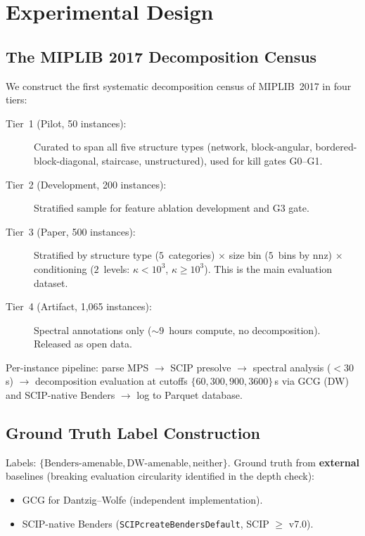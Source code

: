 \documentclass[12pt]{article}
\begin{document}
\section{Experimental Design}
\label{sec:experiments}

\subsection{The MIPLIB 2017 Decomposition Census}
\label{sec:census}

We construct the first systematic decomposition census of MIPLIB~2017
\citep{gleixner2021miplib} in four tiers:

\begin{description}
\item[Tier~1 (Pilot, 50 instances):] Curated to span all five structure
  types (network, block-angular, bordered-block-diagonal, staircase,
  unstructured), used for kill gates G0--G1.

\item[Tier~2 (Development, 200 instances):] Stratified sample for feature
  ablation development and G3 gate.

\item[Tier~3 (Paper, 500 instances):] Stratified by structure type
  ($5$~categories) $\times$ size bin ($5$~bins by $\mathrm{nnz}$) $\times$
  conditioning ($2$~levels: $\kappa < 10^3$, $\kappa \geq 10^3$).  This
  is the main evaluation dataset.

\item[Tier~4 (Artifact, 1,065 instances):] Spectral annotations only
  ($\sim 9$~hours compute, no decomposition).  Released as open data.
\end{description}

\noindent
Per-instance pipeline: parse MPS $\to$ SCIP presolve $\to$ spectral analysis
($< 30$\,s) $\to$ decomposition evaluation at cutoffs $\{60, 300, 900, 3600\}$\,s
via GCG (DW) and SCIP-native Benders $\to$ log to Parquet database.

\subsection{Ground Truth Label Construction}
\label{sec:labels}

Labels: $\{\text{Benders-amenable}, \text{DW-amenable}, \text{neither}\}$.
Ground truth from \textbf{external} baselines (breaking evaluation circularity
identified in the depth check):
\begin{itemize}
  \item GCG \citep{gamrath2023gcg} for Dantzig--Wolfe (independent implementation).
  \item SCIP-native Benders (\texttt{SCIPcreateBendersDefault}, SCIP $\geq$ v7.0).
\end{itemize}
\end{document}
